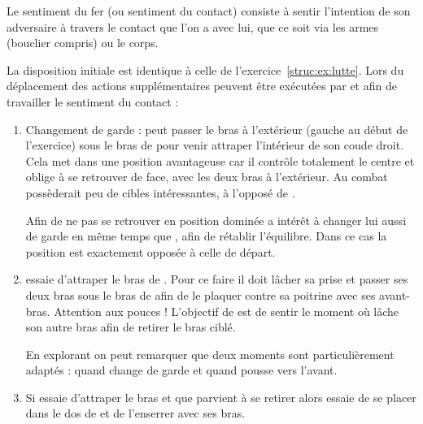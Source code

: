 \begin{definition}
	\label{conc:def:sentiment-fer}

	Le sentiment du fer (ou sentiment du contact) consiste à sentir l'intention de son adversaire à travers le contact que l'on a avec lui, que ce soit via les armes (bouclier compris) ou le corps.
\end{definition}


\begin{exercice}
	\label{att:ex:lutte-variantes}
	
	

	La disposition initiale est identique à celle de l'exercice~\ref{struc:ex:lutte}.
	Lors du déplacement des actions supplémentaires peuvent être exécutées par \A et \D afin de travailler le sentiment du contact :
	\begin{enumerate}
		\item Changement de garde : \A peut passer le bras à l'extérieur (gauche au début de l'exercice) sous le bras de \D pour venir attraper l'intérieur de son coude droit.
		Cela met \A dans une position avantageuse car il contrôle totalement le centre et oblige \D à se retrouver de face, avec les deux bras à l'extérieur.
		Au combat \D possèderait peu de cibles intéressantes, à l'opposé de \A.
		
		Afin de ne pas se retrouver en position dominée \D a intérêt à changer lui aussi de garde en même temps que \A, afin de rétablir l'équilibre.
		Dans ce cas la position est exactement opposée à celle de départ.
		
		\item \A essaie d'attraper le bras de \D.
		Pour ce faire il doit lâcher sa prise et passer ses deux bras sous le bras de \D afin de le plaquer contre sa poitrine avec ses avant-bras.
		Attention aux pouces !
		L'objectif de \D est de sentir le moment où \A lâche son autre bras afin de retirer le bras ciblé.
		
		En explorant on peut remarquer que deux moments sont particulièrement adaptés : quand \D change de garde et quand \D pousse vers l'avant.
		
		\item Si \A essaie d'attraper le bras et que \D parvient à se retirer alors \D essaie de se placer dans le dos de \A et de l'enserrer avec ses bras.
		

\end{enumerate}
\end{exercice}
